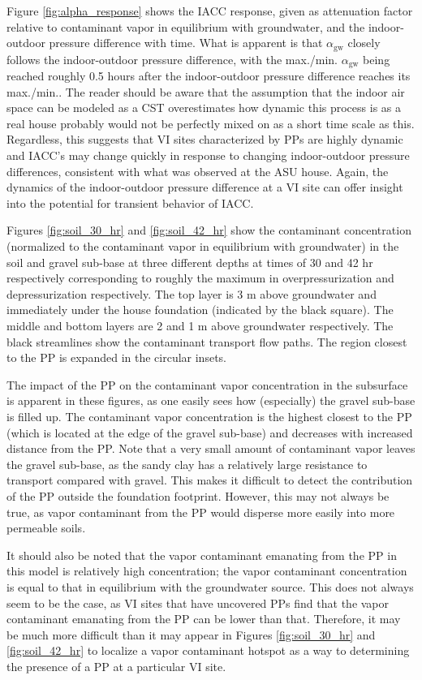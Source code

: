 \documentclass[journal=esthag,manuscript=article]{achemso}
\begin{document}
Figure \ref{fig:alpha_response} shows the IACC response, given as attenuation factor relative to contaminant vapor in equilibrium with groundwater, and the indoor-outdoor pressure difference with time.
What is apparent is that $\alpha_\mathrm{gw}$ closely follows the indoor-outdoor pressure difference, with the max./min. $\alpha_\mathrm{gw}$ being reached roughly 0.5 hours after the indoor-outdoor pressure difference reaches its max./min..
The reader should be aware that the assumption that the indoor air space can be modeled as a CST overestimates how dynamic this process is as a real house probably would not be perfectly mixed on as a short time scale as this.
Regardless, this suggests that VI sites characterized by PPs are highly dynamic and IACC's may change quickly in response to changing indoor-outdoor pressure differences, consistent with what was observed at the ASU house\cite{holton_temporal_2013}.
Again, the dynamics of the indoor-outdoor pressure difference at a VI site can offer insight into the potential for transient behavior of IACC.

Figures \ref{fig:soil_30_hr} and \ref{fig:soil_42_hr} show the contaminant concentration (normalized to the contaminant vapor in equilibrium with groundwater) in the soil and gravel sub-base at three different depths at times of 30 and 42 hr respectively corresponding to roughly the maximum in overpressurization and depressurization respectively.
The top layer is 3 m above groundwater and immediately under the house foundation (indicated by the black square).
The middle and bottom layers are 2 and 1 m above groundwater respectively.
The black streamlines show the contaminant transport flow paths.
The region closest to the PP is expanded in the circular insets.

The impact of the PP on the contaminant vapor concentration in the subsurface is apparent in these figures, as one easily sees how (especially) the gravel sub-base is filled up.
The contaminant vapor concentration is the highest closest to the PP (which is located at the edge of the gravel sub-base) and decreases with increased distance from the PP.
Note that a very small amount of contaminant vapor leaves the gravel sub-base, as the sandy clay has a relatively large resistance to transport compared with gravel.
This makes it difficult to detect the contribution of the PP outside the foundation footprint.
However, this may not always be true, as vapor contaminant from the PP would disperse more easily into more permeable soils.

It should also be noted that the vapor contaminant emanating from the PP in this model is relatively high concentration; the vapor contaminant concentration is equal to that in equilibrium with the groundwater source.
This does not always seem to be the case, as VI sites that have uncovered PPs find that the vapor contaminant emanating from the PP can be lower than that\cite{guo_vapor_2015}.
Therefore, it may be much more difficult than it may appear in Figures \ref{fig:soil_30_hr} and \ref{fig:soil_42_hr} to localize a vapor contaminant hotspot as a way to determining the presence of a PP at a particular VI site.
\end{document}
